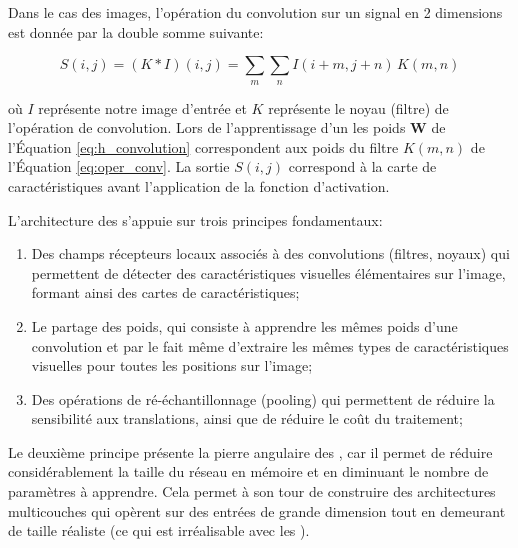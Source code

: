 \vspace{10pt}

Dans le cas des images, l'opération du convolution sur un signal en 2 dimensions est donnée par la double somme suivante:

\begin{equation}
    S(i,j) = (K \ast I)(i,j) = \sum_{m} \sum_{n} I(i+m, j+n)\,K(m,n)
    \label{eq:oper_conv}
\end{equation}

\vspace{10pt}

où $I$  représente notre image d'entrée et $K$ représente le noyau (filtre) de l'opération de convolution.  Lors de l'apprentissage d'un \acrconvnet les poids \textbf{W} de l'Équation \ref{eq:h_convolution} correspondent aux poids du filtre $K(m,n)$ de l'Équation \ref{eq:oper_conv}. La sortie $S(i,j)$ correspond à la carte de caractéristiques avant l'application de la fonction d'activation.

L'architecture des \acrconvnet s’appuie sur trois principes fondamentaux:

\begin{enumerate}
\item  Des champs récepteurs locaux associés à des convolutions (filtres, noyaux) qui permettent de détecter des caractéristiques visuelles élémentaires sur l’image, formant ainsi des cartes de caractéristiques;
\item  Le partage des poids, qui consiste à apprendre les mêmes poids d’une convolution et par le fait même d’extraire les mêmes types de caractéristiques visuelles pour toutes les positions sur l’image; 
\item  Des opérations de ré-échantillonnage (pooling) qui permettent de réduire la sensibilité aux translations, ainsi que de réduire le coût du traitement;
\end{enumerate}
Le deuxième principe présente la pierre angulaire des \acrconvnetns, car il permet de réduire considérablement la taille du réseau en mémoire et en diminuant le nombre de paramètres à apprendre. Cela permet à son tour de construire des architectures multicouches qui opèrent sur des entrées de grande dimension tout en demeurant de taille réaliste (ce qui est irréalisable avec les \acrmlpns). 


